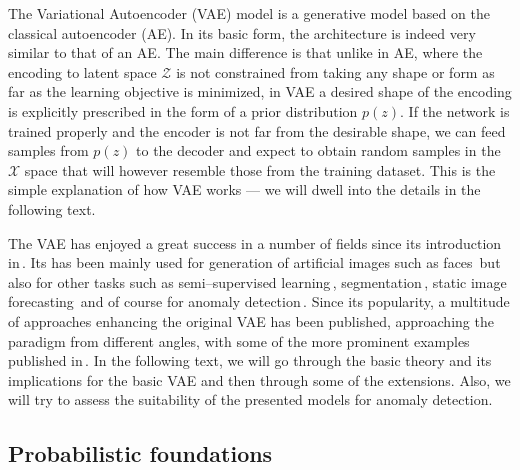 The Variational Autoencoder (VAE) model is a generative model based
on the classical autoencoder (AE). In its basic form, the architecture
is indeed very similar to that of an AE. The main difference is that
unlike in AE, where the encoding to latent space $\mathcal{Z}$ is
not constrained from taking any shape or form as far as the learning
objective is minimized, in VAE a desired shape of the encoding is
explicitly prescribed in the form of a prior distribution $p(z)$.
If the network is trained properly and the encoder is not far from
the desirable shape, we can feed samples from $p(z)$ to the decoder
and expect to obtain random samples in the $\mathcal{X}$ space that
will however resemble those from the training dataset. This is the
simple explanation of how VAE works --- we will dwell into the details
in the following text.

The VAE has enjoyed a great success in a number of fields since its
introduction in\,\cite{kingma2013vae}. Its has been mainly used
for generation of artificial images such as faces\,\cite{rezende2014stochastic}
but also for other tasks such as semi--supervised learning\,\cite{kingma2014semi},
segmentation\,\cite{sohn2015learning}, static image forecasting\,\cite{walker2016uncertain}
and of course for anomaly detection\,\cite{an2015variational,xu2018unsupervised,solch2016variational}.
Since its popularity, a multitude of approaches enhancing the original
VAE has been published, approaching the paradigm from different angles,
with some of the more prominent examples published in\,\cite{higgins2017beta,zhao2017infovae,tolstikhin2017wasserstein,makhzani2015adversarial,pu2017adversarial}.
In the following text, we will go through the basic theory and its
implications for the basic VAE and then through some of the extensions.
Also, we will try to assess the suitability of the presented models
for anomaly detection.

\subsection{Probabilistic foundations}

